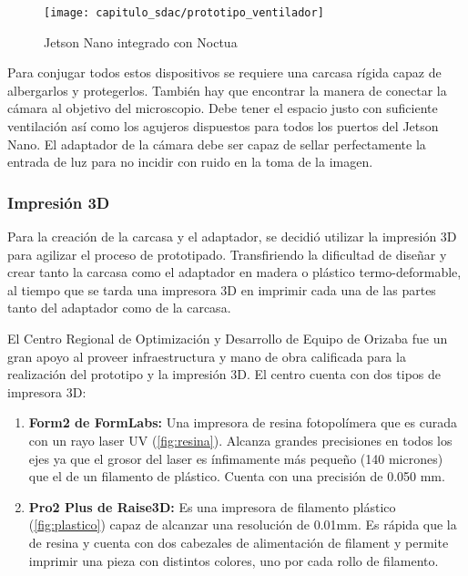 \begin{figure}[H]
    \centering
    \texttt{[image: capitulo\_sdac/prototipo\_ventilador]}
    \caption{Jetson Nano integrado con Noctua}\label{fig:prototipo_ventilador}
\end{figure}

Para conjugar todos estos dispositivos se requiere una carcasa rígida capaz de
albergarlos y protegerlos. También hay que encontrar la manera de conectar la
cámara al objetivo del microscopio. Debe tener el espacio justo con suficiente
ventilación así como los agujeros dispuestos para todos los puertos del Jetson
Nano. El adaptador de la cámara debe ser capaz de sellar perfectamente la
entrada de luz para no incidir con ruido en la toma de la imagen.

\subsubsection{Impresión 3D}

Para la creación de la carcasa y el adaptador, se decidió utilizar la impresión
3D para agilizar el proceso de prototipado. Transfiriendo la dificultad de
diseñar y crear tanto la carcasa como el adaptador en madera o plástico
termo-deformable, al tiempo que se tarda una impresora 3D en imprimir cada una
de las partes tanto del adaptador como de la carcasa.

El Centro Regional de Optimización y Desarrollo de Equipo de Orizaba fue un gran
apoyo al proveer infraestructura y mano de obra calificada para la realización
del prototipo y la impresión 3D. El centro cuenta con dos tipos de impresora 3D:

\begin{enumerate}
    \item{\textbf{Form2 de FormLabs: }}  Una impresora de resina fotopolímera
    que es curada con un rayo laser UV (\autoref{fig:resina}). Alcanza grandes
    precisiones en todos los ejes ya que el grosor del laser es ínfimamente más
    pequeño (140 micrones) que el de un filamento de plástico. Cuenta con una
    precisión de 0.050 mm.
    \item{\textbf{Pro2 Plus de Raise3D: }} Es una impresora de filamento
    plástico (\autoref{fig:plastico}) capaz de alcanzar una resolución de
    0.01mm. Es rápida que la de resina y cuenta con dos cabezales de
    alimentación de filament y permite imprimir una pieza con distintos colores,
    uno por cada rollo de filamento. 
\end{enumerate}

